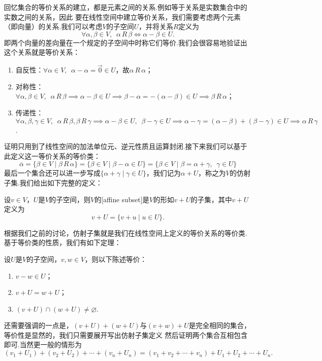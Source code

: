 回忆集合的等价关系的建立，都是元素之间的关系.例如等于关系是实数集合中的实数之间的关系，因此
要在线性空间中建立等价关系，我们需要考虑两个元素（即向量）的关系.我们可以考虑$V$的子空间$U$，并将关系$R$定义为
\[\forall\alpha,\beta\in V,\enspace\alpha\,R\,\beta\iff \alpha-\beta\in U.\]
即两个向量的差向量在一个规定的子空间中时称它们等价.我们会很容易地验证出这个关系就是等价关系：
\begin{enumerate}
    \item 自反性：$\forall \alpha\in V,\enspace\alpha-\alpha=\vec{0}\in U$，故$\alpha\,R\,\alpha$；
    \item 对称性：$\forall \alpha,\beta\in V,\enspace\alpha\,R\,\beta\implies \alpha-\beta\in U\implies \beta-\alpha=-(\alpha-\beta)\in U\implies \beta\,R\,\alpha$；
    \item 传递性：$\forall \alpha,\beta,\gamma\in V,\enspace\alpha\,R\,\beta,\beta\,R\,\gamma\implies \alpha-\beta\in U,\enspace\beta-\gamma\in U\implies \alpha-\gamma=(\alpha-\beta)+(\beta-\gamma)\in U\implies \alpha\,R\,\gamma$.
\end{enumerate}
证明只用到了线性空间的加法单位元、逆元性质且运算封闭.接下来我们可以基于此定义这一等价关系的等价类：
\[\overline{\alpha}=\{\beta\in V \mid \beta\,R\,\alpha\}=\{\beta\in V \mid \beta-\alpha\in U\}=\{\beta\in V \mid \beta=\alpha+\gamma,\enspace\gamma\in U\}\]
最后一个集合还可以进一步写成$\{\alpha+\gamma \mid \gamma\in U\}$，我们记为$\alpha+U$，称之为$V$的仿射子集.我们给出如下完整的定义：
\begin{definition}
    设$v\in V$，$U$是$V$的子空间，则$V$的[affine subset]是$V$的形如$v+U$的子集，其中$v+U$定义为
    \[v+U=\{v+u \mid u\in U\}.\]
\end{definition}
根据我们之前的讨论，仿射子集就是我们在线性空间上定义的等价关系的等价类.基于等价类的性质，我们有如下定理：
\begin{theorem}
    设$U$是$V$的子空间，$v,w\in V$，则以下陈述等价：
    \begin{enumerate}
        \item $v-w\in U$；
        \item $v+U=w+U$；
        \item $(v+U)\cap(w+U)\neq \varnothing$.
    \end{enumerate}
\end{theorem}

还需要强调的一点是，$(v+U)+(w+U)$与$(v+w)+U$是完全相同的集合，等价性是显然的，我们只需要展开写出仿射子集定义
然后证明两个集合互相包含即可.当然更一般的情形为
\[(v_1+U_1)+(v_2+U_2)+\cdots+(v_n+U_n)=(v_1+v_2+\cdots+v_n)+U_1+U_2+\cdots+U_n.\]

